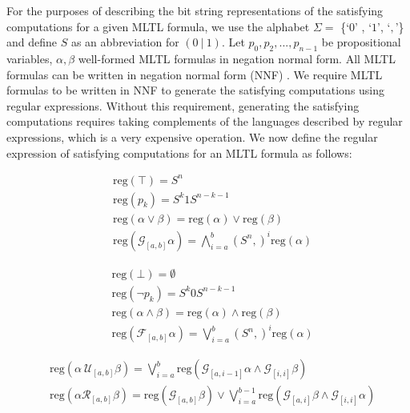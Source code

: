 \documentclass[runningheads]{llncs}
\begin{document}
For the purposes of describing the bit string representations of the satisfying computations for a given MLTL formula, we use the alphabet $\Sigma =$ \{`$0$' , `$1$', `$,$'\} and define $S$ as an abbreviation for $(0 \ | \ 1)$.
Let $p_0, p_2, ..., p_{n-1}$ be propositional variables, $\alpha, \beta$ well-formed MLTL formulas in negation normal form. 
All MLTL formulas can be written in negation normal form (NNF) \cite{bmc}. We require MLTL formulas to be written in NNF to generate the satisfying computations using regular expressions. Without this requirement, generating the satisfying computations requires taking complements of the languages described by regular expressions, which is a very expensive operation.
We now define the regular expression of satisfying computations for an MLTL formula as follows:

\begin{minipage}{0.50 \textwidth}
    \begin{align}
    &\text{reg}(\top) = S^n\\
    &\text{reg}(p_k) = S^{k}1S^{n-k-1} \\
    &\text{reg}(\alpha \lor \beta) =  \text{reg}(\alpha) \lor \text{reg}(\beta)\\
    &\text{reg}(\mathcal{G}_{[a,b]} \alpha) = \bigwedge_{i=a}^{b} (S^n,)^i \text{reg}(\alpha)
    \end{align}
\end{minipage}
\begin{minipage}{0.50 \textwidth}
    \begin{align}
    &\text{reg}(\bot) = \emptyset \\
    &\text{reg}(\neg p_k) = S^{k}0S^{n-k-1} \\
    &\text{reg}(\alpha \land \beta) = \text{reg}(\alpha) \land \text{reg}(\beta)\\
    &\text{reg}(\mathcal{F}_{[a,b]} \alpha) = \bigvee_{i=a}^{b} (S^n,)^i \text{reg}(\alpha) 
    \end{align}
\end{minipage}
\begin{align}
    &\text{reg}(\alpha \ \mathcal{U}_{[a,b]} \beta) =  \bigvee_{i=a}^{b} \text{reg}\left(\mathcal{G}_{[a,i-1]}\alpha \land \mathcal{G}_{[i, i]} \beta\right) \\
    &\text{reg}(\alpha \mathcal{R}_{[a,b]} \beta) =  \text{reg}\left(\mathcal{G}_{[a,b]}\beta\right) \lor \bigvee_{i=a}^{b-1} \text{reg}\left(\mathcal{G}_{[a,i]}\beta \land \mathcal{G}_{[i, i]} \alpha\right) \label{release}
\end{align}
\end{document}
